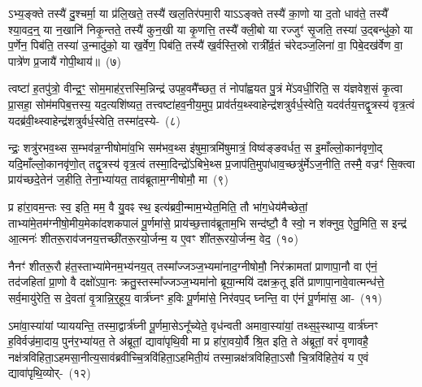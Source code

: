 ऽभ्य॒ङ्क्ते तस्यै॑ दु॒श्चर्मा॒ या प्र॑लि॒खते॒ तस्यै॑ खल॒तिर॑पमा॒री या\-ऽ\-ऽङ्क्ते तस्यै॑ का॒णो या द॒तो धाव॑ते॒ तस्यै᳚ श्या॒वद॒न्॒ या न॒खानि॑ निकृ॒न्तते॒ तस्यै॑ कुन॒खी या कृ॒णत्ति॒ तस्यै᳚ क्ली॒बो या रज्जुꣳ॑ सृ॒जति॒ तस्या॑ उ॒द्बन्धु॑को॒ या प॒र्णेन॒ पिब॑ति॒ तस्या॑ उ॒न्मादु॑को॒ या ख॒र्वेण॒ पिब॑ति॒ तस्यै॑ ख॒र्वस्ति॒स्रो रात्री᳚र्व्र॒तं च॑रेदञ्ज॒लिना॑ वा॒ पिबे॒दख॑र्वेण वा॒ पात्रे॑ण प्र॒जायै॑ गोपी॒थाय॑॥~(७)

{\anuvakamend[{यथ्सो॑म॒पान॑न्ते वृ॒क्णात्तस्य॒ नाश्यं॑ वदेत॒ मारु॑को॒ या\-ऽख॑र्वेण वा॒ त्रीणि॑ च}]}%

त्वष्टा॑ ह॒तपु॑त्रो॒ वीन्द्र॒ꣳ॒ सोम॒माह॑र॒त्तस्मि॒न्निन्द्र॑ उपह॒वमै᳚च्छत॒ तं नोपा᳚ह्वयत पु॒त्रं मे॑\-ऽवधी॒रिति॒ स य॑ज्ञवेश॒सं कृ॒त्वा प्रा॒सहा॒ सोम॑मपिब॒त्तस्य॒ यद॒त्यशि॑ष्यत॒ तत्त्वष्टा॑हव॒नीय॒मुप॒ प्राव॑र्तय॒थ्स्वाहेन्द्र॑शत्रुर्वर्ध॒स्वेति॒ यदव॑र्तय॒त्तद्वृ॒त्रस्य॑ वृत्र॒त्वं यदब्र॑वी॒थ्स्वाहेन्द्र॑शत्रुर्वर्ध॒स्वेति॒ तस्मा॑द॒स्ये-~(८)

न्द्रः॒ शत्रु॑रभव॒थ्स स॒म्भव॑न्न॒ग्नी\-षोमा॑व॒भि सम॑भव॒थ्स इ॑षुमा॒त्रमि॑षुमात्रं॒ विष्व॑ङ्ङवर्धत॒ स इ॒माँल्लो॒कान॑वृणो॒द् यदि॒माँल्लो॒का\-नवृ॑णो॒त् तद्वृ॒त्रस्य॑ वृत्र॒त्वं तस्मा॒दिन्द्रो॑\-ऽबिभे॒थ्स प्र॒जा\-प॑ति॒मुपा॑\-धाव॒च्छत्रु॑र्मे\-ऽज॒नीति॒ तस्मै॒ वज्रꣳ॑ सि॒क्त्वा प्राय॑च्छदे॒तेन॑ ज॒हीति॒ तेना॒भ्या॑यत॒ ताव॑ब्रूताम॒ग्नी\-षोमौ॒ मा~(९)

प्र हा॑रा॒वम॒न्तः स्व॒ इति॒ मम॒ वै यु॒वꣴ स्थ॒ इत्य॑ब्रवी॒न्माम॒भ्ये\-त॒मिति॒ तौ भा॑ग॒धेय॑मैच्छेतां॒ ताभ्या॑मे॒त\-म॑ग्नीषो॒मीय॒\-मेका॑\-दश\-कपालं पू॒र्णमा॑से॒ प्राय॑च्छ॒त्ताव॑ब्रूताम॒भि सन्द॑ष्टौ॒ वै स्वो॒ न श॑क्नुव॒ ऐतु॒मिति॒ स इन्द्र॑ आ॒त्मनः॑ शीतरू॒राव॑जनय॒त्तच्छी॑तरू॒रयो॒र्जन्म॒ य ए॒वꣳ शी॑तरू॒रयो॒र्जन्म॒ वेद॒~(१०)


नैनꣳ॑ शीतरू॒रौ ह॑त॒स्ताभ्या॑मेनम॒भ्य॑नय॒त् तस्मा᳚ज्जञ्ज॒भ्यमा॑\-नाद॒ग्नी\-षोमौ॒ निर॑क्रामतां प्राणापा॒नौ वा ए॑नं॒ तद॑जहितां प्रा॒णो वै दक्षो॑\-ऽपा॒नः क्रतु॒स्तस्मा᳚ज्जञ्ज॒भ्यमा॑नो ब्रूया॒न्मयि॑ दक्षक्र॒तू इति॑ प्राणापा॒नावे॒वात्मन्ध॑त्ते॒ सर्व॒मायु॑रेति॒ स दे॒वता॑ वृ॒त्रान्नि॒र्॒\mbox{}हूय॒ वार्त्र॑घ्नꣳ ह॒विः पू॒र्णमा॑से॒ निर॑वप॒द् घ्नन्ति॒ वा ए॑नं पू॒र्णमा॑स॒ आ-~(११)

ऽमा॑वा॒स्या॑यां प्याययन्ति॒ तस्मा॒द्वार्त्र॑घ्नी पू॒र्णमा॒से\-ऽनू᳚च्येते॒ वृध॑न्वती अमावा॒स्या॑यां॒ तथ्स॒ꣴ॒स्थाप्य॒ वार्त्र॑घ्नꣳ ह॒विर्वज्र॑मा॒दाय॒ पुन॑र॒भ्या॑यत॒ ते अ॑ब्रूतां॒ द्यावा॑पृथि॒वी मा प्र हा॑रा॒वयो॒र्वै श्रि॒त इति॒ ते अ॑ब्रूतां॒ वरं॑ वृणावहै॒ नक्ष॑त्रविहिता॒\-ऽहमसा॒नीत्य॒साव॑ब्रवीच्चि॒त्रवि॑हिता॒\-ऽहमिती॒यं तस्मा॒न्नक्ष॑त्रविहिता॒\-ऽसौ चि॒त्रवि॑हिते॒यं य ए॒वं द्यावा॑पृथि॒व्योर्-~(१२)

